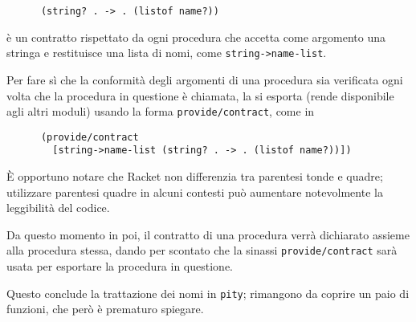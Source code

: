 \begin{lstlisting}
      (string? . -> . (listof name?))
\end{lstlisting}

\`e un contratto rispettato da ogni procedura che accetta come argomento una
stringa e restituisce una lista di nomi, come \lstinline{string->name-list}.

Per fare s\`i che la conformit\`a degli argomenti di una procedura sia
verificata ogni volta che la procedura in questione \`e chiamata, la si
esporta (rende disponibile agli altri moduli) usando la forma
\lstinline{provide/contract}, come in

\begin{lstlisting}
      (provide/contract
        [string->name-list (string? . -> . (listof name?))])
\end{lstlisting}

\`E opportuno notare che Racket non differenzia tra parentesi tonde e quadre;
utilizzare parentesi quadre in alcuni contesti pu\`o aumentare notevolmente
la leggibilit\`a del codice.

Da questo momento in poi, il contratto di una procedura verr\`a dichiarato
assieme alla procedura stessa, dando per scontato che la sinassi
\lstinline{provide/contract} sar\`a usata per esportare la procedura in
questione.

Questo conclude la trattazione dei nomi in \lstinline{pity}; rimangono da
coprire un paio di funzioni, che per\`o \`e prematuro spiegare.
